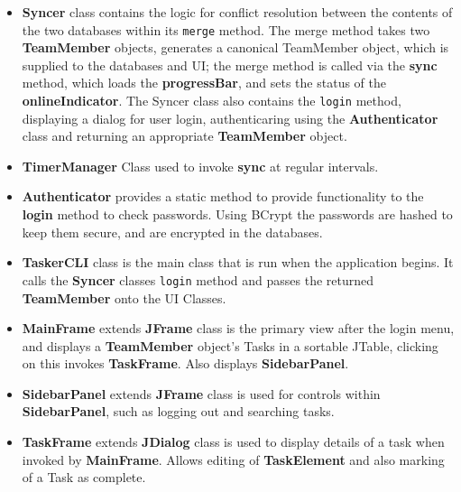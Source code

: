 \documentclass{project}
\begin{document}
\begin{itemize}
        \item \textbf{Syncer} class contains the logic for conflict resolution between the contents of the two databases within its \texttt{merge} method. The merge method takes two \textbf{TeamMember} objects, generates a canonical TeamMember object, which is supplied to the databases and UI; the merge method is called via the \textbf{sync} method, which loads the \textbf{progressBar}, and sets the status of the \textbf{onlineIndicator}. The Syncer class also contains the \texttt{login} method, displaying a dialog for user login, authenticaring using the \textbf{Authenticator} class and returning an appropriate \textbf{TeamMember} object.
        \item \textbf{TimerManager} Class used to invoke \textbf{sync} at regular intervals.
        \item \textbf{Authenticator}  provides a static method to provide functionality to the \textbf{login} method to check passwords. Using BCrypt the passwords are hashed to keep them secure, and are encrypted in the databases. 
        \item \textbf{TaskerCLI} class is the main class that is run when the application begins. It calls the \textbf{Syncer} classes \texttt{login} method and passes the returned \textbf{TeamMember} onto the UI Classes.
        \item \textbf{MainFrame} extends \textbf{JFrame} class is the primary view after the login menu, and displays a \textbf{TeamMember} object's Tasks in a sortable JTable, clicking on this invokes \textbf{TaskFrame}. Also displays \textbf{SidebarPanel}.
        \item \textbf{SidebarPanel} extends \textbf{JFrame} class is used for controls within \textbf{SidebarPanel}, such as logging out and searching tasks.
        \item \textbf{TaskFrame} extends \textbf{JDialog} class is used to display details of a task when invoked by \textbf{MainFrame}. Allows editing of \textbf{TaskElement} and also marking of a Task as complete.
  \end{itemize}
\clearpage  
  
\end{document}
